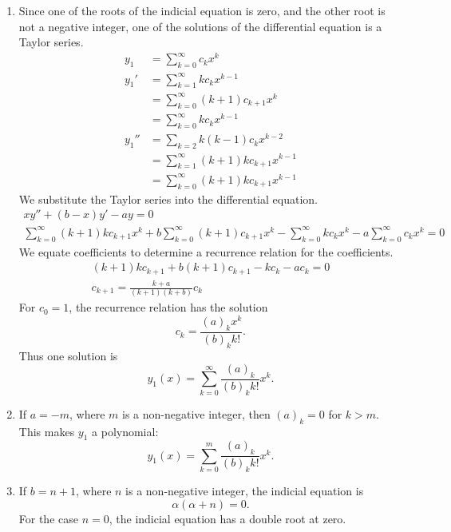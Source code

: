 {\begin{Solution}
\begin{enumerate}
\begin{gather*}
      \boxed{
        \alpha( \alpha + b - 1 ) = 0.
        }
    \end{gather*}
  \item
    Since one of the roots of the indicial equation is zero, and the other 
    root is not a negative integer, one of the solutions of the differential
    equation is a Taylor series.  
    \begin{align*}
      y_1 &= \sum_{k=0}^\infty c_k x^k \\
      y_1' &= \sum_{k=1}^\infty k c_k x^{k-1} \\
      &= \sum_{k=0}^\infty (k+1) c_{k+1} x^k \\
      &= \sum_{k=0}^\infty k c_k x^{k-1} \\
      y_1'' &= \sum_{k = 2} k(k-1) c_k x^{k-2} \\
      &= \sum_{k=1}^\infty (k+1)k c_{k+1} x^{k-1} \\
      &= \sum_{k=0}^\infty (k+1)k c_{k+1} x^{k-1} 
    \end{align*}
    We substitute the Taylor series into the differential equation.
    \begin{gather*}
      x y'' + (b - x) y' - a y = 0 \\
      \sum_{k=0}^\infty (k+1)k c_{k+1} x^k + b \sum_{k=0}^\infty (k+1) c_{k+1} x^k
      - \sum_{k=0}^\infty k c_k x^k - a\sum_{k=0}^\infty c_k x^k = 0 
    \end{gather*}
    We equate coefficients to determine a recurrence relation for the coefficients.
    \begin{gather*}
      (k+1) k c_{k+1} + b (k+1) c_{k+1} - k c_k - a c_k = 0 \\
      c_{k+1} = \frac{k + a}{(k+1)(k+b)} c_k 
    \end{gather*}
    For $c_0 = 1$, the recurrence relation has the solution
    \[
    c_k = \frac{ (a)_k x^k }{ (b)_k k! }.
    \]
    Thus one solution is
    \[
    \boxed{
      y_1(x) =  \sum_{k=0}^\infty \frac{ (a)_k }{ (b)_k k! } x^k.
      }
    \]
  \item
    If $a = -m$, where $m$ is a non-negative integer, then $(a)_{k} = 0$
    for $k > m$.  This makes $y_1$ a polynomial:
    \[
    \boxed{
      y_1(x) =  \sum_{k=0}^m \frac{ (a)_k }{ (b)_k k! } x^k.
      }
    \]
  \item
    If $b = n+1$, where $n$ is a non-negative integer, the indicial equation is
    \[
    \alpha( \alpha + n ) = 0.
    \]
    For the case $n = 0$, the indicial equation has a double root at zero.  

\end{enumerate}
\end{Solution}}
